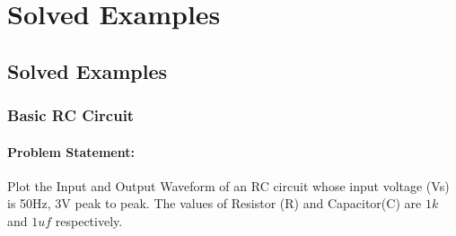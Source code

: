 \chapter{Solved Examples}
\thispagestyle{empty}
\label{chap14}

\section{Solved Examples}

\subsection{Basic RC Circuit}
\subsubsection{Problem Statement:} Plot the Input and Output Waveform of an RC circuit whose input voltage (Vs) is 50Hz, 3V peak to peak. The values of Resistor (R) and Capacitor(C) are $1k$ and $1uf$ respectively.
